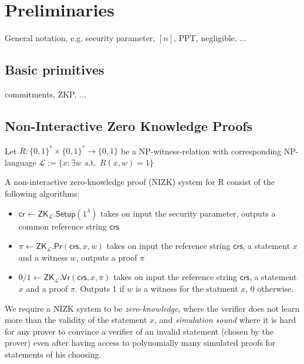 
\section{Preliminaries}

\begin{todobox}
    General notation, e.g. security parameter, $[n]$, PPT, negligible, ...
\end{todobox}

\subsection{Basic primitives}

\begin{todobox}
    commitments, ZKP, ...
\end{todobox}
\subsection{Non-Interactive Zero Knowledge Proofs}

Let $R: \{0, 1\}^* \times \{0, 1\}^* \rightarrow \{0, 1\}$ be a NP-witness-relation with corresponding NP-language $\mathcal{L} := \{x : \exists w \:\: \text{s.t.} \:\: R(x, w) = 1\}$

A non-interactive zero-knowledge proof (NIZK) system for R consist of the following algorithms:
\begin{itemize}
    \item $\mathsf{cr} \gets \mathsf{ZK}_\mathcal{L}.\mathsf{Setup}(1^\lambda)$ takes on input the security parameter, outputs a common reference string $\mathsf{crs}$
    \item $\pi \gets \mathsf{ZK}_\mathcal{L}.\mathsf{Pr}(\mathsf{crs}, x, w)$ takes on input the reference string $\mathsf{crs}$, a statement $x$ and a witness $w$, outputs a proof $\pi$
    \item $0/1 \gets \mathsf{ZK}_\mathcal{L}.\mathsf{Vr}(\mathsf{crs}, x,\pi)$ takes on input the reference string $\mathsf{crs}$, a statement $x$ and a proof $\pi$. Outputs 1 if $w$ is a witness for the statment $x$, 0 otherwise.
\end{itemize}
We require a NIZK system to be \textit{zero-knowledge}, where the verifier does not learn more than the validity of the statement $x$, and \textit{simulation sound} where it is hard for any prover
to convince a verifier of an invalid statement (chosen by the prover) even after having access to polynomially many simulated proofs for statements of his choosing.

